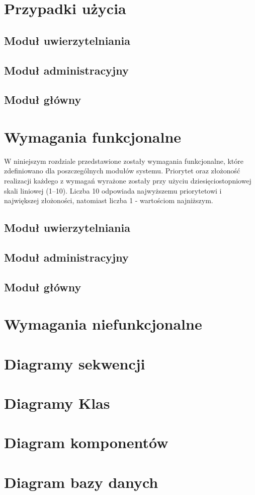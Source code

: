 \documentclass[12pt, oneside, final]{report}
\begin{document}
\chapter{Przypadki użycia}
\section{Moduł uwierzytelniania}

\section{Moduł administracyjny}

\section{Moduł główny}


\chapter{Wymagania funkcjonalne}
W niniejszym rozdziale przedstawione zostały wymagania funkcjonalne, które zdefiniowano dla poszczególnych modułów systemu. Priorytet oraz złożoność realizacji każdego z wymagań wyrażone zostały przy użyciu dziesięciostopniowej skali liniowej (1--10). Liczba 10 odpowiada najwyższemu priorytetowi i największej złożoności, natomiast liczba 1 - wartościom najniższym.
\section{Moduł uwierzytelniania}

\section{Moduł administracyjny}

\section{Moduł główny}


\chapter{Wymagania niefunkcjonalne}


\chapter{Diagramy sekwencji}


\chapter{Diagramy Klas}


\chapter{Diagram komponentów}


\chapter{Diagram bazy danych}

\end{document}
